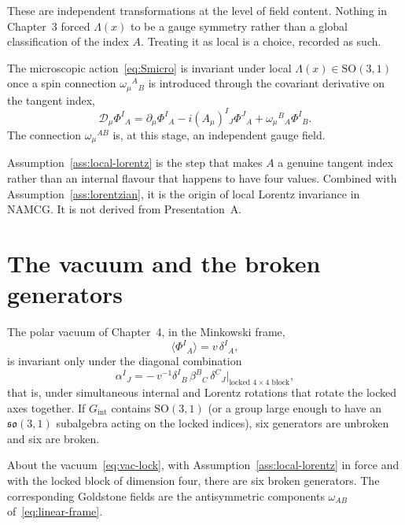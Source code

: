 These are independent transformations at the level of field content.
Nothing in Chapter~3 forced \(\Lambda(x)\) to be a gauge symmetry
rather than a global classification of the index \(A\). Treating it
as local is a choice, recorded as such.

\begin{assumption}
  \label{ass:local-lorentz}
  The microscopic action~\eqref{eq:Smicro} is invariant under
  local \(\Lambda(x)\in\mathrm{SO}(3,1)\) once a spin connection
  \(\omega_\mu{}^A{}_B\) is introduced through the covariant
  derivative on the tangent index,
  \begin{equation}
    \label{eq:D-both}
    \mathcal{D}_\mu\Phi^I{}_A
    =\partial_\mu\Phi^I{}_A
     -i(A_\mu)^I{}_J\Phi^J{}_A
     +\omega_\mu{}^B{}_A\Phi^I{}_B.
  \end{equation}
  The connection \(\omega_\mu{}^{AB}\) is, at this stage, an
  independent gauge field.
\end{assumption}

Assumption~\ref{ass:local-lorentz} is the step that makes \(A\) a
genuine tangent index rather than an internal flavour that happens
to have four values. Combined with Assumption~\ref{ass:lorentzian},
it is the origin of local Lorentz invariance in NAMCG. It is not
derived from Presentation~A.

\section{The vacuum and the broken generators}
\label{sec:ch10-broken}

The polar vacuum of Chapter~4, in the Minkowski frame,
\begin{equation}
  \label{eq:vac-lock}
  \langle\Phi^I{}_A\rangle=v\,\delta^I{}_A,
\end{equation}
is invariant only under the diagonal combination
\begin{equation}
  \label{eq:diagonal}
  \alpha^I{}_J
  =-\,v^{-1}\delta^I{}_B\,\beta^B{}_C\,\delta^C{}_J
   \Big|_{\text{locked \(4\times 4\) block}},
\end{equation}
that is, under simultaneous internal and Lorentz rotations that
rotate the locked axes together. If \(G_{\mathrm{int}}\) contains
\(\mathrm{SO}(3,1)\) (or a group large enough to have an
\(\mathfrak{so}(3,1)\) subalgebra acting on the locked indices),
six generators are unbroken and six are broken.

\begin{proposition}
  \label{prop:goldstone-count}
  About the vacuum~\eqref{eq:vac-lock}, with
  Assumption~\ref{ass:local-lorentz} in force and with the locked
  block of dimension four, there are six broken generators. The
  corresponding Goldstone fields are the antisymmetric components
  \(\omega_{AB}\) of~\eqref{eq:linear-frame}.
\end{proposition}


